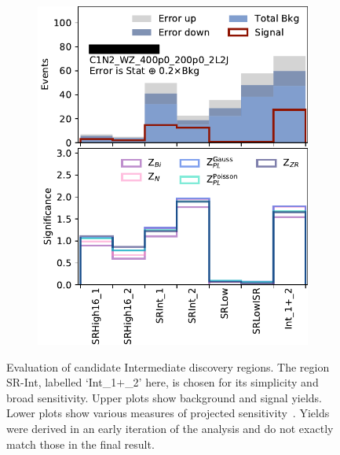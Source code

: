 \begin{figure}[tp]
\begin{subfigure}{0.495\textwidth}
\includegraphics[width=\textwidth]{figures/2ljets_disco_Int_C1N2_WZ_400p0_200p0_2L2J.png}
\caption{}
\end{subfigure}
\caption[
Evaluation of candidate Intermediate discovery regions
]{%
Evaluation of candidate Intermediate discovery regions.
The region SR-Int, labelled `Int\_1$+$\_2' here, is chosen for its simplicity
and broad sensitivity.
Upper plots show background and signal yields.
Lower plots show various measures of projected
sensitivity~\cite{cousins2008evaluation}.
Yields were derived in an early iteration of the analysis and do not exactly
match those in the final result.
}
\label{fig:2ljets_disco_trials_int}
\end{figure}

